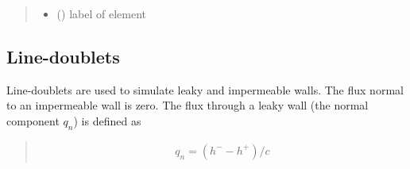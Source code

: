 \documentclass[letterpaper,10pt,english]{sphinxmanual}
\begin{document}
\begin{fulllineitems}
\begin{quote}
\begin{description}
\begin{itemize}
\item {} 
 () \textendash{} label of element

\end{itemize}

\end{description}\end{quote}




{\hyperref[\detokenize{linesinks/linesinkditch:timml.linesink.LineSinkDitch}]{}}



\end{fulllineitems}



\subsection{Line-doublets}
\label{\detokenize{linedoublets/linedoubletindex:line-doublets}}\label{\detokenize{linedoublets/linedoubletindex::doc}}
Line-doublets are used to simulate leaky and impermeable walls.
The flux normal to an impermeable wall is zero. The flux through a leaky wall (the normal component \(q_{n}\)) is defined as
\begin{quote}
\begin{equation*}
\begin{split}q_n = (h^- - h^+)/c\end{split}
\end{equation*}\end{quote}
\end{document}
